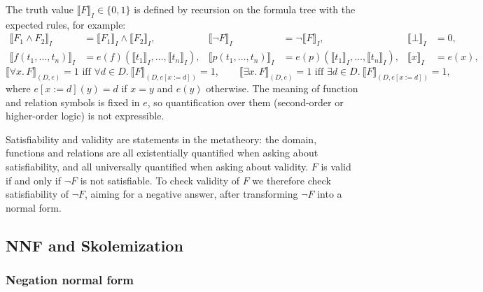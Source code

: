 The truth value $\llbracket F \rrbracket_I \in \{0,1\}$ is defined by recursion on the formula tree with the expected rules, for example:
\begin{align*}
\llbracket F_1 \wedge F_2 \rrbracket_I &= \llbracket F_1 \rrbracket_I \wedge \llbracket F_2 \rrbracket_I, &
\llbracket \neg F \rrbracket_I &= \neg \llbracket F \rrbracket_I, &
\llbracket \bot \rrbracket_I &= 0,\\
\llbracket f(t_1, \ldots, t_n) \rrbracket_I &= e(f)(\llbracket t_1 \rrbracket_I, \ldots, \llbracket t_n \rrbracket_I), &
\llbracket p(t_1, \ldots, t_n) \rrbracket_I &= e(p)(\llbracket t_1 \rrbracket_I, \ldots, \llbracket t_n \rrbracket_I), &
\llbracket x \rrbracket_I &= e(x),
\end{align*}
\[
\llbracket \forall x.\, F \rrbracket_{(D,e)} = 1 \text{ iff } \forall d \in D.\ \llbracket F \rrbracket_{(D, e[x := d])} = 1, \qquad
\llbracket \exists x.\, F \rrbracket_{(D,e)} = 1 \text{ iff } \exists d \in D.\ \llbracket F \rrbracket_{(D, e[x := d])} = 1,
\]
where $e[x := d](y) = d$ if $x = y$ and $e(y)$ otherwise. The meaning of function and relation symbols is fixed in $e$, so quantification over them (second-order or higher-order logic) is not expressible.
 
 
Satisfiability and validity are statements in the metatheory: the domain, functions and relations are all existentially quantified when asking about satisfiability, and all universally quantified when asking about validity. $F$ is valid if and only if $\neg F$ is not satisfiable. To check validity of $F$ we therefore check satisfiability of $\neg F$, aiming for a negative answer, after transforming $\neg F$ into a normal form.
 
\subsection{NNF and Skolemization}
 
\subsubsection*{Negation normal form}
 
